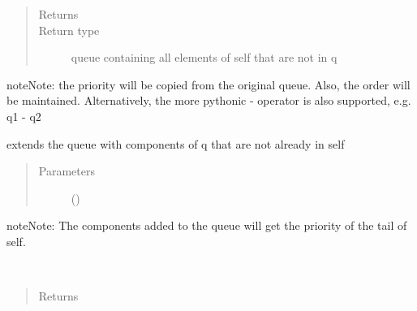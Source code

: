 \documentclass[letterpaper,10pt,english]{sphinxmanual}
\begin{document}
\begin{fulllineitems}
\begin{fulllineitems}
\begin{quote}
\begin{description}
\begin{itemize}
\end{itemize}

\item[{Returns}] \leavevmode


\item[{Return type}] \leavevmode
queue containing all elements of self that are not in q

\end{description}\end{quote}

\begin{sphinxadmonition}{note}{Note:}
the priority will be copied from the original queue.
Also, the order will be maintained. 
Alternatively, the more pythonic - operator is also supported, e.g. q1 - q2
\end{sphinxadmonition}

\end{fulllineitems}


\begin{fulllineitems}
\label{\detokenize{Reference:salabim.Queue.extend}}
extends the queue with components of q that are not already in self
\begin{quote}\begin{description}
\item[{Parameters}] \leavevmode
{} (\sphinxstyleliteralemphasis{, }) \textendash{} 

\end{description}\end{quote}

\begin{sphinxadmonition}{note}{Note:}
The components added to the queue will get the priority of the tail of self.
\end{sphinxadmonition}

\end{fulllineitems}


\begin{fulllineitems}
\label{\detokenize{Reference:salabim.Queue.head}}~\begin{quote}\begin{description}
\item[{Returns}] \leavevmode
{}


\end{description}
\end{quote}
\end{fulllineitems}
\end{fulllineitems}
\end{document}
